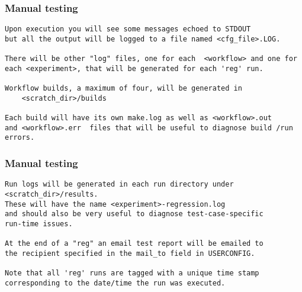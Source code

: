\begin{frame}[fragile]\frametitle{Manual testing}

\footnotesize{
\begin{verbatim}
Upon execution you will see some messages echoed to STDOUT 
but all the output will be logged to a file named <cfg_file>.LOG.

There will be other "log" files, one for each  <workflow> and one for 
each <experiment>, that will be generated for each 'reg' run.

Workflow builds, a maximum of four, will be generated in 
	<scratch_dir>/builds
	
Each build will have its own make.log as well as <workflow>.out 
and <workflow>.err  files that will be useful to diagnose build /run 
errors.
\end{verbatim}
}

\end{frame}

\begin{frame}[fragile]\frametitle{Manual testing}

\footnotesize{
\begin{verbatim}
Run logs will be generated in each run directory under 
<scratch_dir>/results.
These will have the name <experiment>-regression.log 
and should also be very useful to diagnose test-case-specific 
run-time issues.

At the end of a "reg" an email test report will be emailed to 
the recipient specified in the mail_to field in USERCONFIG.

Note that all 'reg' runs are tagged with a unique time stamp 
corresponding to the date/time the run was executed. 
\end{verbatim}
}

\end{frame}

